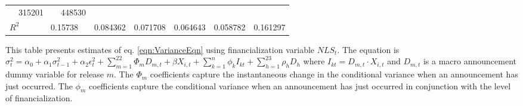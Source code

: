 \begin{sidewaystable}
{\begin{tabular}{@{}lllllllllllll@{}}
\multicolumn{2}{c}{ 315201 }                                                   & \multicolumn{2}{c}{ 448530 }                                                 \\ \textbf{$R^2$}             &\multicolumn{2}{c}{ 0.15738 }                                                 & \multicolumn{2}{c}{ 0.084362 }                                                 & \multicolumn{2}{c}{ 0.071708 }                                                 & \multicolumn{2}{c}{ 0.064643 }                                                 & \multicolumn{2}{c}{ 0.058782 }                                                   & \multicolumn{2}{c}{ 0.161297 }                                                 \\ \bottomrule 
\end{tabular}
}
\begin{tablenotes}\item 
        \singlespacing
        \footnotesize
        This table presents estimates of eq. \ref{eqn:VarianceEqn} using financialization variable $NLS_t$. The equation is $\sigma_{t}^2=\alpha_0+\alpha_1 \sigma_{t-1}^2+\alpha_2 \epsilon_t^2 +\sum_{m=1}^{22} \Phi_m D_{m,t}+\beta X_{i,t}+\sum_{k=1}^n \phi_k I_{kt} + \sum_{h=1}^{23} \rho_h D_h$ where $I_{kt}=D_{m,t} \cdot X_{i,t}$ and $D_{m,t}$ is a macro announcement dummy variable for release $m$. The $\Phi_m$ coefficients capture the instantaneous change in the conditional variance when an announcement has just occurred. The $\phi_m$ coefficients capture the conditional variance when an announcement has just occurred in conjunction with the level of financialization.
\end{tablenotes}
\end{sidewaystable}

